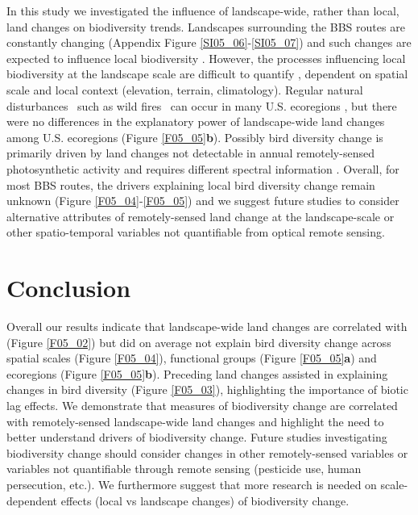 In this study we investigated the influence of landscape-wide, rather than local, land changes on biodiversity trends. Landscapes surrounding the BBS routes are constantly changing (Appendix Figure \ref{SI05_06}-\ref{SI05_07}) and such changes are expected to influence local biodiversity \citep{Manning2009,Turner2015,Seppelt2016}. However, the processes influencing local biodiversity at the landscape scale are difficult to quantify \citep{Chase2003}, dependent on spatial scale \citep{Miguet2015} and local context (elevation, terrain, climatology). Regular natural disturbances \textendash\ such as wild fires \textendash\ can occur in many U.S. ecoregions \citep{Morgan2001}, but there were no differences in the explanatory power of landscape-wide land changes among U.S. ecoregions (Figure \ref{F05_05}\textbf{b}). Possibly bird diversity change is primarily driven by land changes not detectable in annual remotely-sensed photosynthetic activity and requires different spectral information \citep{Zhu2014}. Overall, for most BBS routes, the drivers explaining local bird diversity change remain unknown (Figure \ref{F05_04}-\ref{F05_05}) and we suggest future studies to consider alternative attributes of remotely-sensed land change at the landscape-scale \citep{Watson2014} or other spatio-temporal variables not quantifiable from optical remote sensing.

\section{Conclusion}
\label{C05_05}

Overall our results indicate that landscape-wide land changes are correlated with (Figure \ref{F05_02}) but did on average not explain bird diversity change across spatial scales (Figure \ref{F05_04}), functional groups (Figure \ref{F05_05}\textbf{a}) and ecoregions (Figure \ref{F05_05}\textbf{b}). Preceding land changes assisted in explaining changes in bird diversity (Figure \ref{F05_03}), highlighting the importance of biotic lag effects. We demonstrate that measures of biodiversity change are correlated with remotely-sensed landscape-wide land changes and highlight the need to better understand drivers of biodiversity change. Future studies investigating biodiversity change should consider changes in other remotely-sensed variables or variables not quantifiable through remote sensing (\eg pesticide use, human persecution, etc.). We furthermore suggest that more research is needed on scale-dependent effects (local vs landscape changes) of biodiversity change. 

\clearpage
%

%  
